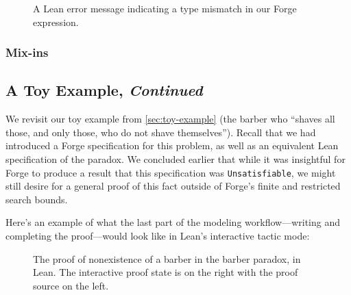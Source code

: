 \begin{figure}[h!]
  \centering
  \caption{A Lean error message indicating a type mismatch in our Forge expression.}
  \label{fig:sc-type-mismatch}
\end{figure}

\subsubsection{Mix-ins}


\subsection{A Toy Example, \emph{Continued}}\label{sec:toy-example-continued}

We revisit our toy example from \cref{sec:toy-example} (the barber who ``shaves all those, and only those, who do not shave themselves''). Recall that we had introduced a Forge specification for this problem, as well as an equivalent Lean specification of the paradox. We concluded earlier that while it was insightful for Forge to produce a result that this specification was \texttt{Unsatisfiable}, we might still desire for a general proof of this fact outside of Forge's finite and restricted search bounds. 

Here's an example of what the last part of the modeling workflow---writing and completing the proof---would look like in Lean's interactive tactic mode: 

\begin{figure}[h!]
  \centering
  \caption{The proof of nonexistence of a barber in the barber paradox, in Lean. The interactive proof state is on the right with the proof source on the left. }
  \label{fig:barber-proof}
\end{figure}

